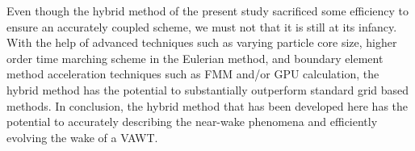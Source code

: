 	Even though the hybrid method of the present study sacrificed some efficiency to ensure an accurately coupled scheme, we must not that it is still at its infancy. With the help of advanced techniques such as varying particle core size, higher order time marching scheme in the Eulerian method, and boundary element method acceleration techniques such as FMM and/or GPU calculation, the hybrid method has the potential to substantially outperform standard grid based methods. In conclusion, the hybrid method that has been developed here has the potential to accurately describing the near-wake phenomena and efficiently evolving the wake of a VAWT.

